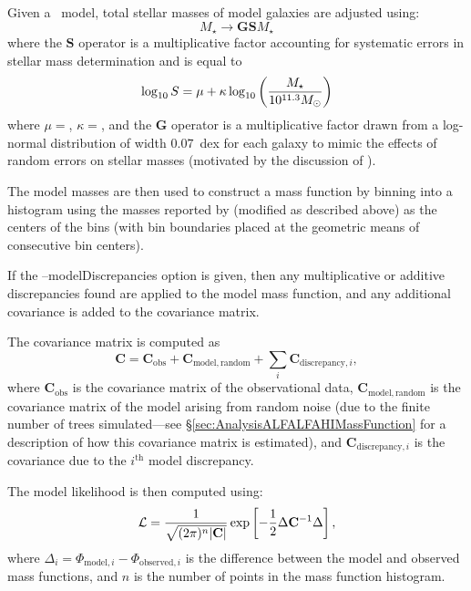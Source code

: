 Given a \glc\ model, total stellar masses of model galaxies are adjusted using:
\begin{equation}
 M_\star \rightarrow \mathbf{G} \mathbf{S} M_\star 
\end{equation}
where the $\mathbf{S}$ operator is a multiplicative factor accounting for systematic errors in stellar mass determination and is equal to \citep{behroozi_comprehensive_2010}
\begin{equation}
 \log_\mathrm{10} S = \mu + \kappa \log_\mathrm{10} \left({M_\star \over 10^{11.3}M_\odot}\right)
\end{equation}
where $\mu=${\normalfont {}}, $\kappa=${\normalfont {}}, and the {\normalfont \bfseries G} operator is a multiplicative factor drawn from a log-normal distribution of width $0.07$~dex for each galaxy to mimic the effects of random errors on stellar masses (motivated by the discussion of \cite{behroozi_comprehensive_2010}).

The model masses are then used to construct a mass function by binning into a histogram using the masses reported by \cite{li_distribution_2009} (modified as described above) as the centers of the bins (with bin boundaries placed at the geometric means of consecutive bin centers).

If the {\normalfont \ttfamily --modelDiscrepancies} option is given, then any multiplicative or additive discrepancies found are applied to the model mass function, and any additional covariance is added to the covariance matrix.

The covariance matrix is computed as
\begin{equation}
 \mathbf{C} = \mathbf{C}_\mathrm{obs} + \mathbf{C}_\mathrm{model,random} + \sum_i \mathbf{C}_{\mathrm{discrepancy}, i},
\end{equation}
where $\mathbf{C}_\mathrm{obs}$ is the covariance matrix of the observational data, $\mathbf{C}_\mathrm{model,random}$ is the covariance matrix of the model arising from random noise (due to the finite number of trees simulated---see \S\ref{sec:AnalysisALFALFAHIMassFunction} for a description of how this covariance matrix is estimated), and $\mathbf{C}_{\mathrm{discrepancy}, i}$ is the covariance due to the $i^\mathrm{th}$ model discrepancy.

The model likelihood is then computed using:
\begin{equation}
 \mathcal{L} = {1 \over \sqrt{(2 \pi)^n |\mathbf{C}|}} \exp\left[ -{1\over 2} \Delta \mathbf{C}^{-1} \Delta \right],
\end{equation}
where $\Delta_i = \Phi_{\mathrm{model}, i} - \Phi_{\mathrm{observed}, i}$ is the difference between the model and observed mass functions, and $n$ is the number of points in the mass function histogram.

